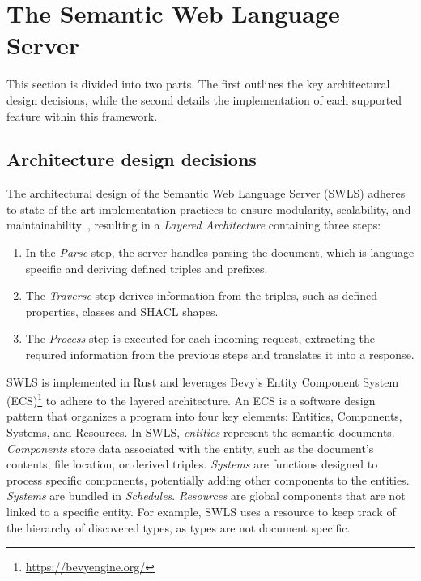 \section{The Semantic Web Language Server}%
\label{sec:semantic_lsp}

This section is divided into two parts. The first outlines the key architectural design decisions, while the second details the implementation of each supported feature within this framework.

\subsection{Architecture design decisions}

The architectural design of the Semantic Web Language Server (SWLS) adheres to state-of-the-art implementation practices to ensure modularity, scalability, and maintainability~\cite{10.1145/3550355.3552452,10.1145/3563834.3567537,10.1145/3550355.3552452,Bour_2018}, resulting in a \textit{Layered Architecture} containing three steps:

\begin{enumerate}
  \item In the \textit{Parse} step, the server handles parsing the document, which is language specific and deriving defined triples and prefixes.

  \item The \textit{Traverse} step derives information from the triples, such as defined properties, classes and SHACL shapes. 

  \item The \textit{Process} step is executed for each incoming request, extracting the required information from the previous steps and translates it into a response.
\end{enumerate}

SWLS is implemented in Rust and leverages Bevy’s Entity Component System (ECS)\footnote{\url{https://bevyengine.org/}} to adhere to the layered architecture.
An ECS is a software design pattern that organizes a program into four key elements: Entities, Components, Systems, and Resources. 
In SWLS, \textit{entities} represent the semantic documents. 
\textit{Components} store data associated with the entity, such as the document's contents, file location, or derived triples. 
\textit{Systems} are functions designed to process specific components, potentially adding other components to the entities.
\textit{Systems} are bundled in \textit{Schedules}. 
\textit{Resources} are global components that are not linked to a specific entity.
For example, SWLS uses a resource to keep track of the hierarchy of discovered types, as types are not document specific.

